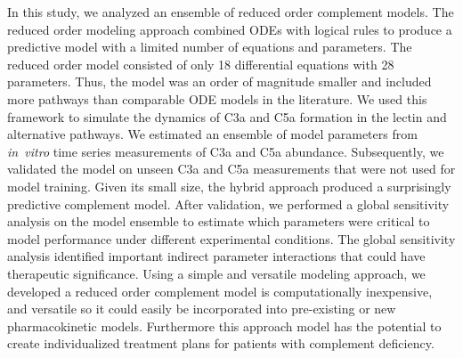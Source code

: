 \documentclass[12pt]{article}
\begin{document}
In this study, we analyzed an ensemble of reduced order complement models.
The reduced order modeling approach combined ODEs with logical rules to produce a predictive model with a limited number of equations and parameters.
The reduced order model consisted of only 18 differential equations with 28 parameters.
Thus, the model was an order of magnitude smaller and included more pathways than comparable ODE models in the literature.
We used this framework to simulate the dynamics of C3a and C5a formation in the lectin and alternative pathways.
We estimated an ensemble of model parameters from \textit{in~vitro} time series measurements of C3a and C5a abundance.
Subsequently, we validated the model on unseen C3a and C5a measurements that were not used for model training.
Given its small size, the hybrid approach produced a surprisingly predictive complement model.
After validation, we performed a global sensitivity analysis on the model ensemble to estimate which parameters were critical to model performance under different experimental conditions.
The global sensitivity analysis identified important indirect parameter interactions that could have therapeutic significance.
Using a simple and versatile modeling approach, we developed a reduced order complement model is computationally inexpensive, and versatile so it could easily be incorporated into pre-existing or new pharmacokinetic models. Furthermore this approach model has the potential to create individualized treatment plans for patients with complement deficiency.
\end{document}
